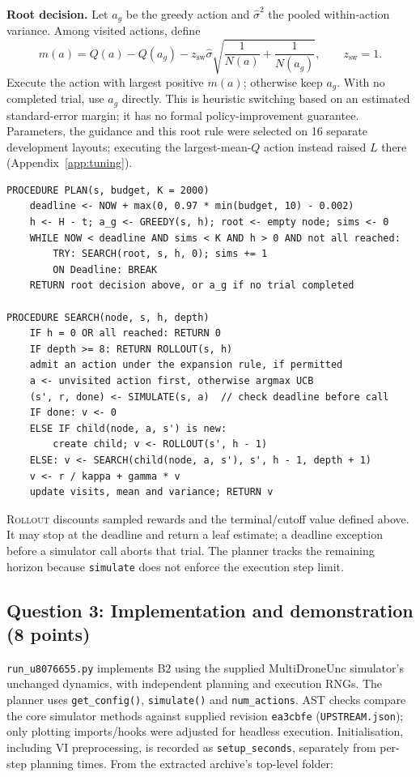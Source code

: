 \textbf{Root decision.} Let $a_g$ be the greedy action and $\hat\sigma^2$
the pooled within-action variance. Among visited actions, define
\[
 m(a)=Q(a)-Q(a_g)-z_{\mathrm{sw}}\hat\sigma
 \sqrt{\frac1{N(a)}+\frac1{N(a_g)}},\qquad z_{\mathrm{sw}}=1.
\]
Execute the action with largest positive $m(a)$; otherwise keep $a_g$.
With no completed trial, use $a_g$ directly.
This is heuristic switching based on an estimated standard-error margin;
it has no formal policy-improvement guarantee. Parameters, the guidance and
this root rule were selected on 16 separate development layouts;
executing the largest-mean-$Q$ action instead raised $L$ there
(Appendix~\ref{app:tuning}).

\noindent\begin{minipage}{\linewidth}
\begin{lstlisting}[style=pseudocode,basicstyle=\ttfamily\small,caption={Online UCT; rollout and admission rules are defined above.}]
PROCEDURE PLAN(s, budget, K = 2000)
    deadline <- NOW + max(0, 0.97 * min(budget, 10) - 0.002)
    h <- H - t; a_g <- GREEDY(s, h); root <- empty node; sims <- 0
    WHILE NOW < deadline AND sims < K AND h > 0 AND not all reached:
        TRY: SEARCH(root, s, h, 0); sims += 1
        ON Deadline: BREAK
    RETURN root decision above, or a_g if no trial completed

PROCEDURE SEARCH(node, s, h, depth)
    IF h = 0 OR all reached: RETURN 0
    IF depth >= 8: RETURN ROLLOUT(s, h)
    admit an action under the expansion rule, if permitted
    a <- unvisited action first, otherwise argmax UCB
    (s', r, done) <- SIMULATE(s, a)  // check deadline before call
    IF done: v <- 0
    ELSE IF child(node, a, s') is new:
        create child; v <- ROLLOUT(s', h - 1)
    ELSE: v <- SEARCH(child(node, a, s'), s', h - 1, depth + 1)
    v <- r / kappa + gamma * v
    update visits, mean and variance; RETURN v
\end{lstlisting}
\end{minipage}
\textsc{Rollout} discounts sampled rewards and the terminal/cutoff value
defined above. It may stop at the deadline and return a leaf estimate;
a deadline exception before a simulator call aborts that trial.
The planner tracks the remaining horizon because \texttt{simulate} does
not enforce the execution step limit.

\subsection*{Question 3: Implementation and demonstration (8 points)}
\texttt{run\_u8076655.py} implements B2 using the supplied MultiDroneUnc
simulator's unchanged dynamics, with independent planning and
execution RNGs. The planner uses \texttt{get\_config()},
\texttt{simulate()} and \texttt{num\_actions}. AST checks compare the
core simulator methods against supplied revision \texttt{ea3cbfe}
(\texttt{UPSTREAM.json}); only plotting imports/hooks were adjusted for
headless execution. Initialisation, including VI preprocessing, is recorded
as \texttt{setup\_seconds}, separately from per-step planning times.
From the extracted archive's top-level folder:

